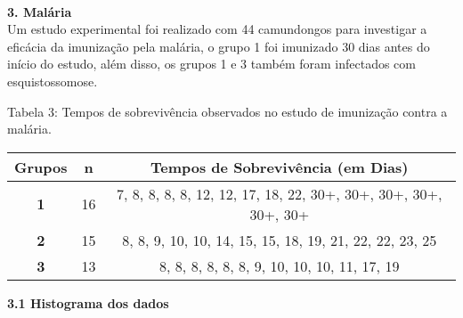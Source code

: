 \documentclass[12pt,a4paper]{article}
\begin{document}
	\vspace{1cm}\\
	\textbf{3. Malária}
	\vspace{0.5cm}\\
	Um estudo experimental foi realizado com 44 camundongos para investigar a eficácia da imunização pela malária, o grupo 1 foi imunizado 30 dias antes do início do estudo, além disso, os grupos 1 e 3 também foram infectados com esquistossomose.
	\begin{center}
		\small{Tabela 3: Tempos de sobrevivência observados no estudo de imunização contra a malária.}\\
		\begin{tabular}{|c|c|c|}\hline
			\textbf{Grupos} & \textbf{n} & \textbf{Tempos de Sobrevivência (em Dias)}\\ \hline
			\textbf{1} & 16 & 7, 8, 8, 8, 8, 12, 12, 17, 18, 22, 30+, 30+, 30+, 30+, 30+, 30+\\ \hline
			\textbf{2} & 15 & 8, 8, 9, 10, 10, 14, 15, 15, 18, 19, 21, 22, 22, 23, 25\\ \hline
			\textbf{3} & 13 & 8, 8, 8, 8, 8, 8, 9, 10, 10, 10, 11, 17, 19\\ \hline
		\end{tabular}
	\end{center}
	\vspace{1cm}
	\textbf{3.1 Histograma dos dados}
\end{document}
